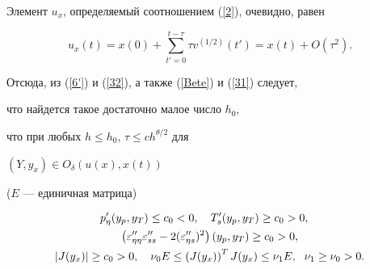 Элемент $u_{x}$, определяемый соотношением (\ref{2}), очевидно, равен 


$$


u_x(t)=x(0)+\sum^{t-\tau}_{t'=0} \tau v^{(1/2)}(t')


= x(t) + O(\tau^2).


$$


Отсюда, из (\ref{6'}) и (\ref{32}), а также (\ref{Bete}) и (\ref{31}) следует,


что найдется такое достаточно малое число  $h_0$, 


что при любых $h \leq h_0$, $\tau \leq c h^{\theta /2}$  для


$(Y,y_x) \in O_\delta(u(x),x(t))$ 


($E$ --- единичная матрица)


\begin{gather}


p'_\eta(y_p,y_T)\le c_0<0,\quad T'_s(y_p,y_T)\geq c_0>0,\quad 


\notag\\


\left(\varepsilon''_{\eta \eta}\varepsilon''_{s s}


-2(\varepsilon''_{\eta s})^2 \right)(y_p,y_T)\geq c_0>0,\label{33} \\


|J(y_x)|\ge c_0>0, \quad \nu _0 E \le \left( {J(y_x)} \right) ^T J(y_x)


\leq \nu _1 E, \ \; \nu_1 \geq \nu_0>0. \label{34}


\end{gather}





